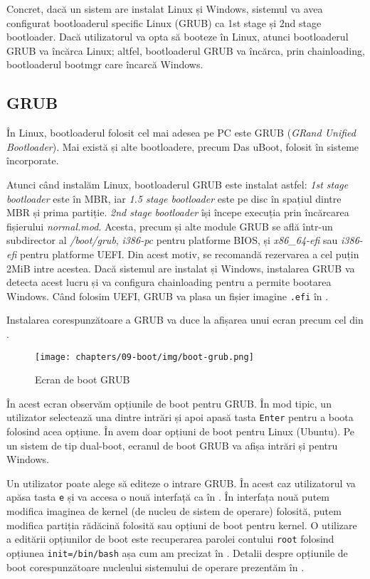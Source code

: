 Concret, dacă un sistem are instalat Linux și Windows, sistemul va avea configurat bootloaderul specific Linux (GRUB) ca 1st stage și 2nd stage bootloader.
Dacă utilizatorul va opta să booteze în Linux, atunci bootloaderul GRUB va încărca Linux;
altfel, bootloaderul GRUB va încărca, prin chainloading, bootloaderul bootmgr care încarcă Windows.

\subsection{GRUB}
\label{sec:boot:bootloader:grub}

În Linux, bootloaderul folosit cel mai adesea pe PC este GRUB (\textit{GRand Unified Bootloader}).
Mai există și alte bootloadere, precum Das uBoot, folosit în sisteme încorporate.

Atunci când instalăm Linux, bootloaderul GRUB este instalat astfel: \textit{1st stage bootloader} este în MBR, iar \textit{1.5 stage bootloader} este pe disc în spațiul dintre MBR și prima partiție.
 \textit{2nd stage bootloader} își începe execuția prin încărcarea fișierului \textit{normal.mod}.
 Acesta, precum și alte module GRUB se află într-un subdirector al \textit{/boot/grub}, \textit{i386-pc} pentru platforme BIOS, și \textit{x86_64-efi} sau \textit{i386-efi} pentru platforme UEFI.
 Din acest motiv, se recomandă rezervarea a cel puțin 2MiB intre acestea.
 Dacă sistemul are instalat și Windows, instalarea GRUB va detecta acest lucru și va configura chainloading pentru a permite bootarea Windows.
Când folosim UEFI, GRUB va plasa un fișier imagine \texttt{.efi} în .

Instalarea corespunzătoare a GRUB va duce la afișarea unui ecran precum cel din .

\begin{figure}[!htbp]
  \centering
  \texttt{[image: chapters/09-boot/img/boot-grub.png]}
  \caption{Ecran de boot GRUB}
  \label{fig:boot:boot-grub}
\end{figure}

În acest ecran observăm opțiunile de boot pentru GRUB.
În mod tipic, un utilizator selectează una dintre intrări și apoi apasă tasta \texttt{Enter} pentru a boota folosind acea opțiune.
În  avem doar opțiuni de boot pentru Linux (Ubuntu).
Pe un sistem de tip dual-boot, ecranul de boot GRUB va afișa intrări și pentru Windows.

Un utilizator poate alege să editeze o intrare GRUB.
În acest caz utilizatorul va apăsa tasta \texttt{e} și va accesa o nouă interfață ca în .
 În interfața nouă putem modifica imaginea de kernel (de nucleu de sistem de operare) folosită, putem modifica partiția rădăcină folosită sau opțiuni de boot pentru kernel.
O utilizare a editării opțiunilor de boot este recuperarea parolei contului \texttt{root} folosind opțiunea \texttt{init=/bin/bash} așa cum am precizat în .
Detalii despre opțiunile de boot corespunzătoare nucleului sistemului de operare prezentăm în .

